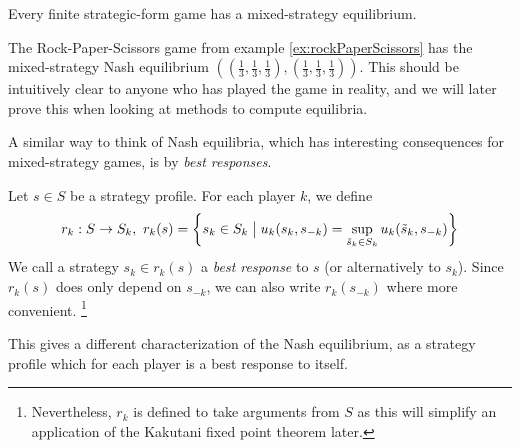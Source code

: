 \documentclass[a4paper]{scrreprt}
\begin{document}
    
    \begin{thm}
        Every finite strategic-form game has a mixed-strategy equilibrium. \cite{bib:fudenbergGameTheory}
    \end{thm}
    
    \begin{ex} %
        The Rock-Paper-Scissors game from example \ref{ex:rockPaperScissors}
        has the mixed-strategy Nash equilibrium $((\frac{1}{3}, \frac{1}{3}, \frac{1}{3}), (\frac{1}{3}, \frac{1}{3}, \frac{1}{3}))$.
        This should be intuitively clear to anyone who has played the game in reality, and we will later prove this when looking at methods to compute equilibria.
    \end{ex}
    
    A similar way to think of Nash equilibria, which has interesting consequences for mixed-strategy games, is by \emph{best responses}.
    
    \begin{defn}
        Let $s \in S$ be a strategy profile. For each player $k$, we define 
        \[
            r_k: S \to S_k,~ r_k(s) = \biggl\{s_k \in S_k \bigm\vert u_k(s_k, s_{-k}) = \sup_{\tilde{s}_k \in S_k} u_k(\tilde{s}_k, s_{-k}) \biggr\}
        \]
        We call a strategy $s_k \in r_k(s)$ a \emph{best response} to $s$ (or alternatively to $s_k$).
        Since $r_k(s)$ does only depend on $s_{-k}$, we can also write $r_k(s_{-k})$ where more convenient. %
        \footnote{Nevertheless, $r_k$ is defined to take arguments from $S$ as this will simplify an application of the Kakutani fixed point theorem later. %
        }
    \end{defn}
    
    This gives a different characterization of the Nash equilibrium, as a strategy profile which for each player is a best response to itself.
    
\end{document}
